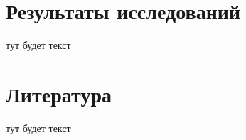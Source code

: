 \documentclass[14pt]{extreport}
\begin{document}

	\chapter{Результаты исследований}
	тут будет текст
	
	\chapter{Литература}
	тут будет текст
	
	
\end{document}
